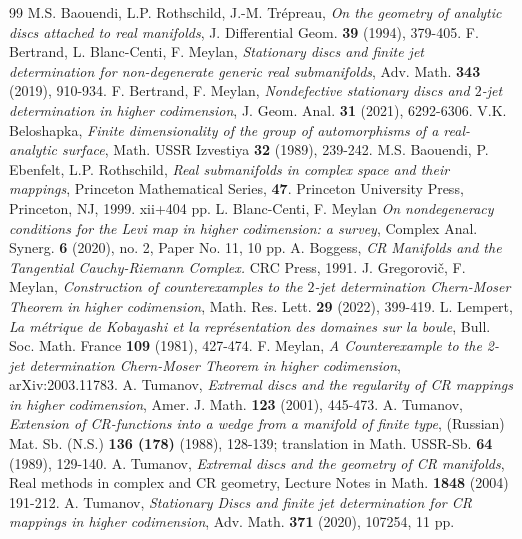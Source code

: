 \documentclass[10pt,a4paper]{amsart}
\numberwithin{equation}{section}
\begin{document}
\begin{thebibliography}{99}
 M.S. Baouendi, L.P. Rothschild, J.-M. Tr\' epreau, {\it On the geometry of analytic discs attached to real manifolds}, J. Differential Geom. \textbf{39} (1994), 379-405.
 F. Bertrand, L. Blanc-Centi, F. Meylan, {\it Stationary discs and finite jet determination for non-degenerate generic real submanifolds}, Adv. Math. {\bf 343} (2019), 910-934.
 F. Bertrand, F. Meylan, {\it Nondefective stationary discs and $2$-jet determination in higher codimension}, J. Geom. Anal. {\bf 31} (2021), 6292-6306.
 V.K. Beloshapka, {\it Finite dimensionality of the group of automorphisms of a real-analytic surface}, Math. USSR Izvestiya {\bf 32} (1989), 239-242.
 M.S. Baouendi, P. Ebenfelt, L.P. Rothschild, {\it Real submanifolds in complex space and their mappings}, Princeton Mathematical Series, {\bf 47}. Princeton University Press, Princeton, NJ, 1999. xii+404 pp.
 L. Blanc-Centi, F. Meylan {\it On nondegeneracy conditions for the Levi map in higher codimension: a survey}, Complex Anal. Synerg. {\bf 6} (2020), no. 2, Paper No. 11, 10 pp.
 A. Boggess, {\it CR Manifolds and the Tangential Cauchy-Riemann Complex.} CRC Press, 1991.
 J. Gregorovi\v c, F. Meylan, {\it Construction of counterexamples to the $2$-jet determination Chern-Moser Theorem in higher codimension}, Math. Res. Lett. {\bf 29} (2022), 399-419.
 L. Lempert, {\it La m\'etrique de Kobayashi et la repr\'esentation des domaines sur la boule}, Bull. Soc. Math. France {\bf 109} (1981), 427-474.
 F. Meylan, {\it A Counterexample to the 2-jet determination Chern-Moser Theorem in higher codimension}, arXiv:2003.11783.
 A. Tumanov, {\it Extremal discs and the regularity of CR mappings in higher codimension}, Amer. J. Math. {\bf 123} (2001), 445-473.
 A. Tumanov, {\it Extension of CR-functions into a wedge from a manifold of finite type}, (Russian) Mat. Sb. (N.S.) {\bf 136 (178)} (1988), 128-139; translation in Math. USSR-Sb. {\bf 64} (1989), 129-140.
 A. Tumanov, {\it Extremal discs and the geometry of CR manifolds}, Real methods in complex and CR geometry, Lecture Notes in Math. {\bf 1848} (2004) 191-212.
 A. Tumanov, {\it Stationary Discs and finite jet determination for CR mappings in higher codimension}, Adv. Math. {\bf 371} (2020), 107254, 11 pp.
\end{thebibliography}
\end{document}
